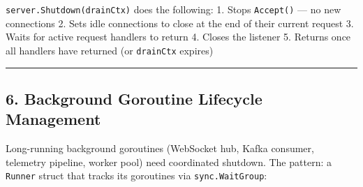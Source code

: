 \documentclass[
]{article}
\begin{document}
\texttt{server.Shutdown(drainCtx)} does the following: 1. Stops
\texttt{Accept()} --- no new connections 2. Sets idle connections to
close at the end of their current request 3. Waits for active request
handlers to return 4. Closes the listener 5. Returns once all handlers
have returned (or \texttt{drainCtx} expires)

\begin{center}\rule{0.5\linewidth}{0.5pt}\end{center}

\hypertarget{background-goroutine-lifecycle-management}{%
\subsection{6. Background Goroutine Lifecycle
Management}\label{background-goroutine-lifecycle-management}}

Long-running background goroutines (WebSocket hub, Kafka consumer,
telemetry pipeline, worker pool) need coordinated shutdown. The pattern:
a \texttt{Runner} struct that tracks its goroutines via
\texttt{sync.WaitGroup}:
\end{document}
